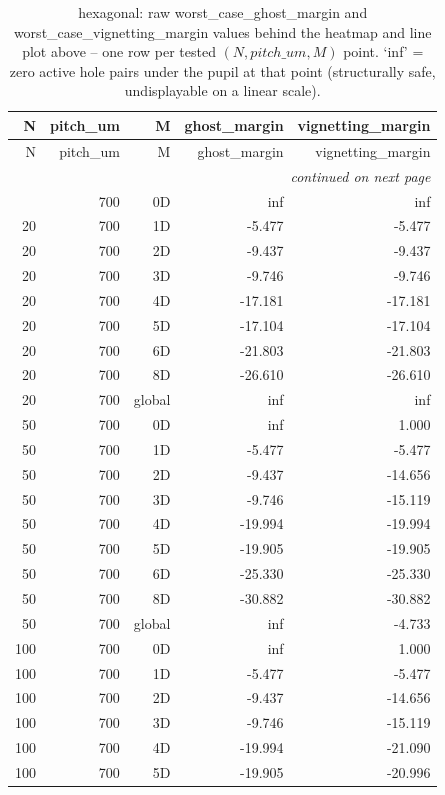 \begin{longtable}{rrrrr}
\caption{hexagonal: raw worst\_case\_ghost\_margin and worst\_case\_vignetting\_margin values behind the heatmap and line plot above -- one row per tested $(N, pitch\_um, M)$ point. `inf' = zero active hole pairs under the pupil at that point (structurally safe, undisplayable on a linear scale).} \\
\toprule
N & pitch\_um & M & ghost\_margin & vignetting\_margin \\
\midrule
\endfirsthead
\toprule
N & pitch\_um & M & ghost\_margin & vignetting\_margin \\
\midrule
\endhead
\midrule
\multicolumn{5}{r}{\itshape continued on next page} \\
\endfoot
\bottomrule
\endlastfoot
20 & 700 & 0D & inf & inf \\
20 & 700 & 1D & -5.477 & -5.477 \\
20 & 700 & 2D & -9.437 & -9.437 \\
20 & 700 & 3D & -9.746 & -9.746 \\
20 & 700 & 4D & -17.181 & -17.181 \\
20 & 700 & 5D & -17.104 & -17.104 \\
20 & 700 & 6D & -21.803 & -21.803 \\
20 & 700 & 8D & -26.610 & -26.610 \\
20 & 700 & global & inf & inf \\
50 & 700 & 0D & inf & 1.000 \\
50 & 700 & 1D & -5.477 & -5.477 \\
50 & 700 & 2D & -9.437 & -14.656 \\
50 & 700 & 3D & -9.746 & -15.119 \\
50 & 700 & 4D & -19.994 & -19.994 \\
50 & 700 & 5D & -19.905 & -19.905 \\
50 & 700 & 6D & -25.330 & -25.330 \\
50 & 700 & 8D & -30.882 & -30.882 \\
50 & 700 & global & inf & -4.733 \\
100 & 700 & 0D & inf & 1.000 \\
100 & 700 & 1D & -5.477 & -5.477 \\
100 & 700 & 2D & -9.437 & -14.656 \\
100 & 700 & 3D & -9.746 & -15.119 \\
100 & 700 & 4D & -19.994 & -21.090 \\
100 & 700 & 5D & -19.905 & -20.996 \\

\end{longtable}
